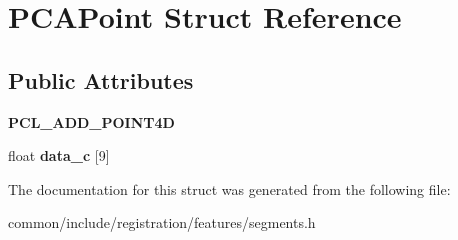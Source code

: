 \hypertarget{structPCAPoint}{
\section{PCAPoint Struct Reference}
\label{structPCAPoint}
}
\subsection*{Public Attributes}
\begin{DoxyCompactItemize}
\item 
\hypertarget{structPCAPoint_aa9e39bf814ad72ad68072a09f4bc61e0}{
{\bfseries PCL\_\-ADD\_\-POINT4D}}
\label{structPCAPoint_aa9e39bf814ad72ad68072a09f4bc61e0}

\item 
\hypertarget{structPCAPoint_a5857d69a72eddbcae53c40f8ca8d1978}{
float {\bfseries data\_\-c} \mbox{[}9\mbox{]}}
\label{structPCAPoint_a5857d69a72eddbcae53c40f8ca8d1978}

\end{DoxyCompactItemize}


The documentation for this struct was generated from the following file:\begin{DoxyCompactItemize}
\item 
common/include/registration/features/segments.h\end{DoxyCompactItemize}
